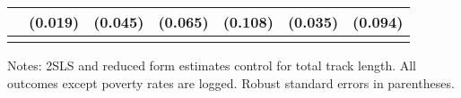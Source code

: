 \begin{table}[H]
{\begin{threeparttable}
\begin{tabular}{lcccccc}
            &     (0.019)         &     (0.045)         &     (0.065)         &     (0.108)         &     (0.035)         &     (0.094)         \\
\bottomrule[0.5pt]                                                                               \label{tab:table2}                                                                       \end{tabular}                                                                                                    \vspace{-13pt}                                                                                           \begin{tablenotes}[flushleft]{\setlength{\itemindent}{-3pt}}          \small                                                                                                           \item Notes: 2SLS and reduced form estimates control for total track length. All outcomes except poverty rates are logged. Robust standard errors in parentheses.           \end{tablenotes}                                                                                         \end{threeparttable}                                                                             }                                                                                                                        \end{table}
